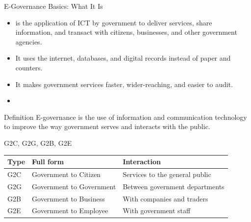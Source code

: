 \documentclass[aspectratio=169]{beamer}
\begin{document}
\begin{frame}{E-Governance Basics: What It Is}
  \begin{itemize}
    \item {} is the application of ICT by government to
      deliver services, share information, and transact with citizens,
      businesses, and other government agencies.
    \item It uses the internet, databases, and digital records instead of
      paper and counters.
    \item It makes government services faster, wider-reaching, and easier to
      audit.
    \item {}
  \end{itemize}
  \begin{block}{Definition}
    E-governance is the use of information and communication technology to
    improve the way government serves and interacts with the public.
  \end{block}
\end{frame}

\begin{frame}{G2C, G2G, G2B, G2E}
  \begin{center}
    \begin{tabular}{p{}p{}p{}}
      \toprule
      \textbf{Type} & \textbf{Full form} & \textbf{Interaction} \\
      \midrule
      G2C & Government to Citizen & Services to the general public \\
      G2G & Government to Government & Between government departments \\
      G2B & Government to Business & With companies and traders \\
      G2E & Government to Employee & With government staff \\
      \bottomrule
    \end{tabular}
  \end{center}
  \vspace{0.25cm}
\end{frame}
\end{document}
